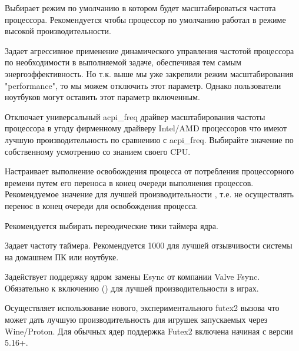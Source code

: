 \documentclass[letterpaper,10pt,russian,openany]{sphinxmanual}
\begin{document}
\sphinxAtStartPar
{} \sphinxhyphen{} Выбирает режим по умолчанию в котором будет масштабироваться частота процессора.
Рекомендуется  чтобы процессор по умолчанию работал в режиме высокой производительности.

\sphinxAtStartPar
{} \sphinxhyphen{} Задает агрессивное применение динамического управления частотой процессора по необходимости в выполняемой задаче,
обеспечивая тем самым энергоэффективность.
Но т.к. выше мы уже закрепили режим масштабирования "performance", то мы можем отключить этот параметр.
Однако пользователи ноутбуков могут оставить этот параметр включенным.

\sphinxAtStartPar
{} \sphinxhyphen{} Отключает универсальный acpi\_freq драйвер масштабирования частоты процессора в угоду фирменному драйверу Intel/AMD процессоров
что имеют лучшую производительность по сравнению с acpi\_freq.
Выбирайте значение по собственному усмотрению со знанием своего CPU.

\sphinxAtStartPar
{} \sphinxhyphen{} Настраивает выполнение освобождения процесса от потребления процессорного времени путем его переноса в конец очереди выполнения процессов.
Рекомендуемое значение для лучшей производительности \sphinxhyphen{} , т.е. не осуществлять перенос в конец очереди для освобождения процесса.

\sphinxAtStartPar
{} \sphinxhyphen{} Рекомендуется выбирать переодические тики таймера ядра.

\sphinxAtStartPar
{} \sphinxhyphen{} Задает частоту таймера.
Рекомендуется 1000 для лучшей отзывчивости системы на домашнем ПК или ноутбуке.

\sphinxAtStartPar
{} \sphinxhyphen{} Задействует поддержку ядром замены Esync от компании Valve \sphinxhyphen{} Fsync.
Обязательно к включению () для лучшей производительности в играх.

\sphinxAtStartPar
{} \sphinxhyphen{} Осуществляет использование нового, экспериментального futex2 вызова что может дать лучшую производительность для игрушек запускаемых через Wine/Proton. Для обычных ядер поддержка Futex2 включена начиная с версии 5.16+.
\end{document}
